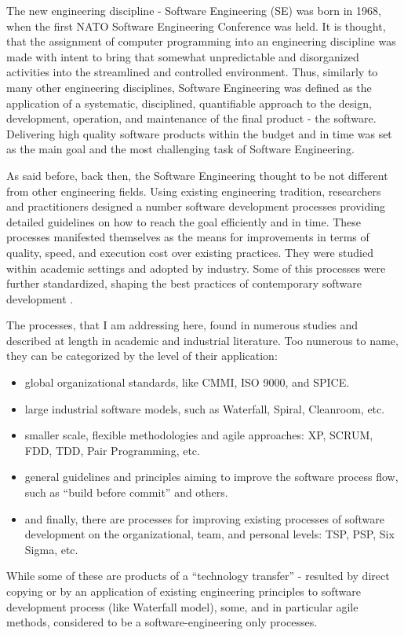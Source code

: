 The new engineering discipline - Software Engineering (SE) was born in 1968, 
when the first NATO Software Engineering Conference was held. It is thought, 
that the assignment of computer programming into an engineering discipline 
was made with intent to bring that somewhat unpredictable and disorganized 
activities into the streamlined and controlled environment. 
Thus, similarly to many other engineering disciplines, Software Engineering was 
defined as the application of a systematic, disciplined, quantifiable 
approach to the design, development, operation, and maintenance of the 
final product - the software.
Delivering high quality software products within the budget and in 
time was set as the main goal and the most challenging task 
of Software Engineering.

As said before, back then, the Software Engineering thought to be not different 
from other engineering fields. Using existing engineering tradition, researchers 
and practitioners designed a number software development processes providing 
detailed guidelines on how to reach the goal efficiently and in time. 
These processes manifested themselves as the means for improvements in terms of quality, 
speed, and execution cost over existing practices. They were studied within academic 
settings and adopted by industry. Some of this processes were further standardized, 
shaping the best practices of contemporary 
software development \cite{citeulike:9962021}. 

The processes, that I am addressing here, found in numerous studies and described at length in 
academic and industrial literature. Too numerous to name, they can be categorized by the level 
of their application:
\begin{itemize}
 \item global organizational standards, like CMMI, ISO 9000, and SPICE. 
 \item large industrial software models, such as Waterfall, Spiral, Cleanroom, etc.
 \item smaller scale, flexible methodologies and agile approaches: XP, SCRUM, FDD, 
TDD, Pair Programming, etc.
 \item general guidelines and principles aiming to improve the software process flow, 
such as ``build before commit'' and others.
 \item and finally, there are processes for improving existing processes of software development 
on the organizational, team, and personal levels: TSP, PSP, Six Sigma, etc.
\end{itemize}
While some of these are products of a ``technology transfer'' - resulted by direct copying or by an 
application of existing engineering principles to software development process (like Waterfall model), 
some, and in particular agile methods, considered to be a software-engineering only processes. 

